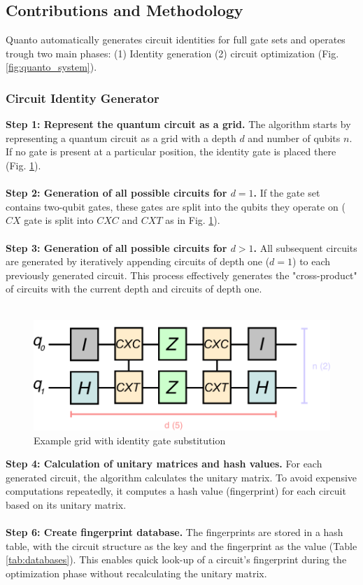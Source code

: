 \subsection{Contributions and Methodology}

Quanto automatically generates circuit identities for full gate sets and operates trough two main phases: (1) Identity generation (2) circuit optimization (Fig. \ref{fig:quanto_system}).

\subsubsection{Circuit Identity Generator}
\textbf{Step 1: Represent the quantum circuit as a grid.}
The algorithm starts by representing a quantum circuit as a grid with a depth $d$ and number of qubits $n$. If no gate is present at a particular position, the identity gate is placed there (Fig. \ref{fig:example_1}).
\\\\
\textbf{Step 2: Generation of all possible circuits for $d = 1$.}
If the gate set contains two-qubit gates, these gates are split into the qubits they operate on ($CX$ gate is split into $CXC$ and $CXT$ as in Fig. \ref{fig:example_1}).
\\\\
\textbf{Step 3: Generation of all possible circuits for $d > 1$.}
All subsequent circuits are generated by iteratively appending circuits of depth one ($d=1$) to each previously generated circuit. This process effectively generates the "cross-product" of circuits with the current depth and circuits of depth one.
\\\\
\begin{figure}
  \includegraphics[width=0.8\columnwidth]{assets/grid_example_2.png}
  \caption{Example grid with identity gate substitution}
  \label{fig:example_1}
\end{figure}
\textbf{Step 4: Calculation of unitary matrices and hash values.}
For each generated circuit, the algorithm calculates the unitary matrix. To avoid expensive computations repeatedly, it computes a hash value (fingerprint) for each circuit based on its unitary matrix.
\\\\
\textbf{Step 6: Create fingerprint database.}
The fingerprints are stored in a hash table, with the circuit structure as the key and the fingerprint as the value (Table \ref{tab:databases}). This enables quick look-up of a circuit’s fingerprint during the optimization phase without recalculating the unitary matrix.

